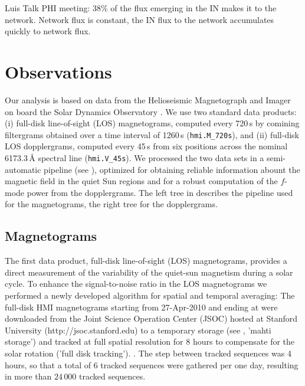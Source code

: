\documentclass{aa}
\begin{document}
\cite[]{2019LRSP...16....1B}
Luis Talk PHI meeting: 38\% of the flux emerging in the IN makes it to the network. Network flux is constant, the IN flux to the network accumulates quickly to network flux.

\cite[]{2015ApJ...806..174J}

\cite[]{2013A&A...555A..33B}

\cite[]{2021arXiv210508657F}

\cite[]{2021arXiv210514533R}

\cite[]{ballot2021changes}


\section{Observations}

Our analysis is based on data from the Helioseismic Magnetograph and Imager \cite[HMI,][]{2012SoPh..275..207S,2012SoPh..275..229S} on board the Solar Dynamics Observatory \cite[SDO,][]{2012SoPh..275....3P}. We use two standard data products: (i) full-disk line-of-sight (LOS) magnetograms, computed every 720\,s by comining filtergrams obtained over a time interval of 1260\,s (\texttt{hmi.M\_720s}), and (ii) full-disk LOS dopplergrams, computed every 45\,s from six positions across the nominal 6173.3\,\AA{} spectral line (\texttt{hmi.V\_45s}). We processed the two data sets in a semi-automatic pipeline (see ), optimized for obtaining reliable information abount the magnetic field in the quiet Sun regions and for a robust computation of the $f$-mode power from the dopplergrams. The left tree in  describes the pipeline used for the magnetograms, the right tree for the dopplergrams.


\subsection{Magnetograms}

The first data product, full-disk line-of-sight (LOS) magnetograms, provides a direct measurement of the variability of the quiet-sun magnetism during a solar cycle. To enhance the signal-to-noise ratio in the LOS magnetograms we performed a newly developed algorithm for spatial and temporal averaging: The full-disk HMI magnetograms starting from 27-Apr-2010 and ending at  were downloaded from the Joint Science Operation Center (JSOC) hosted at Stanford University (http://jsoc.stanford.edu) to a temporary storage (see , 'mahti storage') and tracked at full spatial resolution for 8 hours to compensate for the solar rotation ('full disk tracking').
.
The step between tracked sequences was 4 hours, so that a total of 6 tracked sequences were gathered per one day, resulting in more than $24\,000$ tracked sequences.
\end{document}
